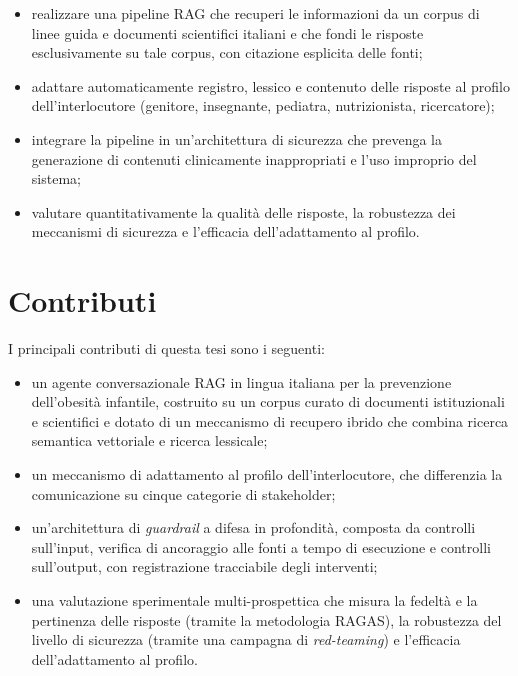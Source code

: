 \begin{itemize}
    \item realizzare una pipeline RAG che recuperi le informazioni da un corpus
    di linee guida e documenti scientifici italiani e che fondi le risposte
    esclusivamente su tale corpus, con citazione esplicita delle fonti;
    \item adattare automaticamente registro, lessico e contenuto delle risposte
    al profilo dell'interlocutore (genitore, insegnante, pediatra,
    nutrizionista, ricercatore);
    \item integrare la pipeline in un'architettura di sicurezza che prevenga la
    generazione di contenuti clinicamente inappropriati e l'uso improprio del
    sistema;
    \item valutare quantitativamente la qualit\`a delle risposte, la robustezza
    dei meccanismi di sicurezza e l'efficacia dell'adattamento al profilo.
\end{itemize}

\section{Contributi}
\label{sec:contributi}

I principali contributi di questa tesi sono i seguenti:

\begin{itemize}
    \item un agente conversazionale RAG in lingua italiana per la prevenzione
    dell'obesit\`a infantile, costruito su un corpus curato di documenti
    istituzionali e scientifici e dotato di un meccanismo di recupero ibrido
    che combina ricerca semantica vettoriale e ricerca lessicale;
    \item un meccanismo di adattamento al profilo dell'interlocutore, che
    differenzia la comunicazione su cinque categorie di stakeholder;
    \item un'architettura di \emph{guardrail} a difesa in profondit\`a, composta
    da controlli sull'input, verifica di ancoraggio alle fonti a tempo di
    esecuzione e controlli sull'output, con registrazione tracciabile degli
    interventi;
    \item una valutazione sperimentale multi-prospettica che misura la fedelt\`a
    e la pertinenza delle risposte (tramite la metodologia RAGAS), la robustezza
    del livello di sicurezza (tramite una campagna di \emph{red-teaming}) e
    l'efficacia dell'adattamento al profilo.
\end{itemize}

